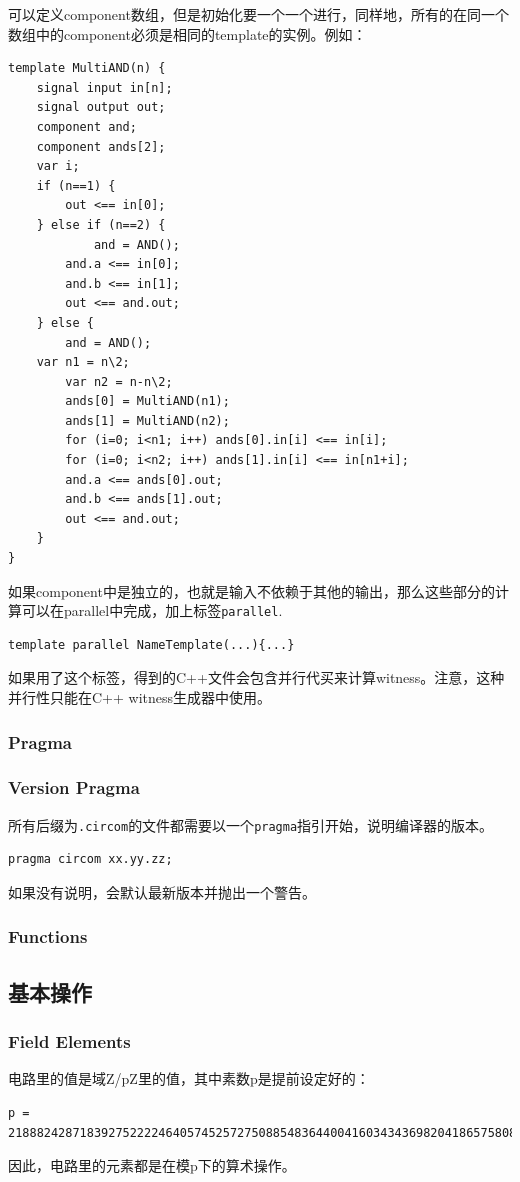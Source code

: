 \documentclass[10pt]{ctexart}
\begin{document}
可以定义component数组，但是初始化要一个一个进行，同样地，所有的在同一个数组中的component必须是相同的template的实例。例如：
\begin{lstlisting}
template MultiAND(n) {
	signal input in[n];
	signal output out;
	component and;
	component ands[2];
	var i;
	if (n==1) {
		out <== in[0];
	} else if (n==2) {
			and = AND();
		and.a <== in[0];
		and.b <== in[1];
		out <== and.out;
	} else {
		and = AND();
	var n1 = n\2;
		var n2 = n-n\2;
		ands[0] = MultiAND(n1);
		ands[1] = MultiAND(n2);
		for (i=0; i<n1; i++) ands[0].in[i] <== in[i];
		for (i=0; i<n2; i++) ands[1].in[i] <== in[n1+i];
		and.a <== ands[0].out;
		and.b <== ands[1].out;
		out <== and.out;
	}
}
\end{lstlisting}
如果component中是独立的，也就是输入不依赖于其他的输出，那么这些部分的计算可以在parallel中完成，加上标签\verb|parallel|. 
\begin{lstlisting}
template parallel NameTemplate(...){...}
\end{lstlisting}
如果用了这个标签，得到的C++文件会包含并行代买来计算witness。注意，这种并行性只能在C++ witness生成器中使用。

\subsubsection{Pragma}
\subsubsection*{Version Pragma}
所有后缀为\verb|.circom|的文件都需要以一个\verb|pragma|指引开始，说明编译器的版本。
\begin{lstlisting}
pragma circom xx.yy.zz;
\end{lstlisting}
如果没有说明，会默认最新版本并抛出一个警告。
\subsubsection{Functions}
\subsection{基本操作}
\subsubsection{Field Elements}
电路里的值是域Z/pZ里的值，其中素数p是提前设定好的：
\begin{lstlisting}
p = 21888242871839275222246405745257275088548364400416034343698204186575808495617.
\end{lstlisting}
因此，电路里的元素都是在模p下的算术操作。
\end{document}
